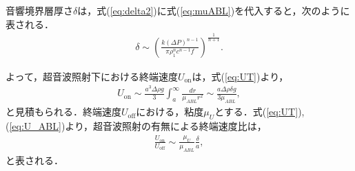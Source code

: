 音響境界層厚さ$\delta$は，式(\ref{eq:delta2})に式(\ref{eq:muABL})を代入すると，次のように表される．
\begin{eqnarray}
    \delta \sim \left(\frac{k\left(\Delta P\right)^{n-1}}{\pi \rho^n_1 c^{n-1} f}\right)^{\frac{1}{n+1}} .
    \label{eq:delta}
\end{eqnarray}

よって，超音波照射下における終端速度$U_\text{on}$は，式(\ref{eq:UT})より，
\begin{eqnarray}
    U_\text{on} \sim \frac{a^3\Delta\rho g}{3}  \int^{\infty}_{a} \frac{dr}{\mu_{ABL} r^2} \sim \frac{a\Delta \rho \delta g}{3\mu_{ABL}} ,
    \label{eq:U_ABL}
\end{eqnarray}
と見積もられる．終端速度$U_\text{off}$における，粘度$\mu_U$とする．式(\ref{eq:UT}),(\ref{eq:U_ABL})より，超音波照射の有無による終端速度比は，
\begin{eqnarray}
    \frac{U_\text{on}}{U_\text{off}} \sim \frac{\mu_U}{\mu_{ABL}}\frac{\delta}{a} ,
    \label{eq:Udiff}
\end{eqnarray}
と表される．
